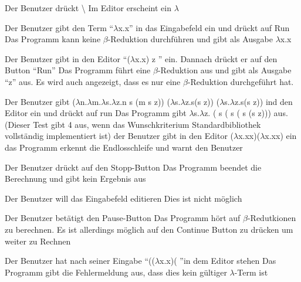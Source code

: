 \documentclass[parskip=full,11pt,twoside]{scrartcl}
\begin{document}

{ Der Benutzer drückt \textbackslash }
{Im Editor erscheint ein $\lambda$}

{Der Benutzer gibt den Term \enquote {$\lambda$x.x} in das Eingabefeld ein und drückt auf Run}
{Das Programm kann keine $\beta$-Reduktion durchführen und gibt als Ausgabe $\lambda$x.x}

{ Der Benutzer gibt in den Editor \enquote {($\lambda$x.x) z } ein. Dannach drückt er auf den Button \enquote {Run}}
{ Das Programm führt eine $\beta$-Reduktion aus und gibt als Ausgabe \enquote {z} aus. Es wird auch angezeigt, dass es nur eine $\beta$-Reduktion durchgeführt hat.}

{Der Benutzer gibt \newline ($\lambda$n.$\lambda$m.$\lambda$s.$\lambda$z.n s (m s z)) ($\lambda$s.$\lambda$z.s(s z)) ($\lambda$s.$\lambda$z.s(s z)) ind den Editor ein und drückt auf run}
{Das Programm gibt $\lambda$s.$\lambda$z. ( s ( s ( s (s z))) aus. (Dieser Test gibt 4 aus, wenn das Wunschkriterium Standardbibliothek vollständig implementiert ist) }
{der Benutzer gibt in den Editor ($\lambda$x.xx)($\lambda$x.xx) ein }
{ das Programm erkennt die Endlosschleife und warnt den Benutzer }

{Der Benutzer drückt auf den Stopp-Button}
{ Das Programm beendet die Berechnung und gibt kein Ergebnis aus }

{Der Benutzer will das Eingabefeld editieren}
{Dies ist nicht möglich}

{Der Benutzer betätigt den Pause-Button}
{Das Programm hört auf $\beta$-Redutkionen zu berechnen. Es ist allerdings möglich auf den Continue Button zu drücken um weiter zu Rechnen}

{ Der Benutzer hat nach seiner Eingabe \enquote{(($\lambda$x.x)( }in dem Editor stehen  }
{ Das Programm gibt die Fehlermeldung aus, dass dies kein gültiger $\lambda$-Term ist }
\end{document}
